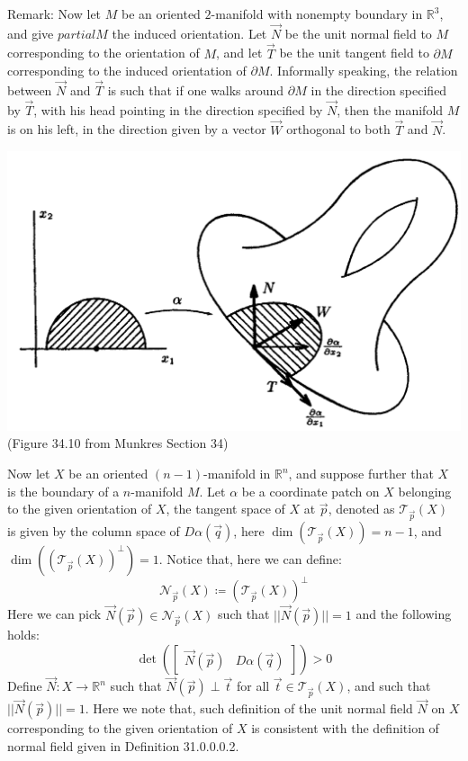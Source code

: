 \documentclass[11pt,oneside]{book}
\theoremstyle{break}
\theoremstyle{break}
\newcommand{\R}{\mathbb{R}}
\newcommand{\T}{\mathcal{T}}
\newcommand{\bmat}[1]{\begin{bmatrix} #1 \end{bmatrix}}
\newcommand{\remark}{\color{blue}Remark: \color{black}}
\begin{document}
\remark Now let $M$ be an oriented $2$-manifold with nonempty boundary in $\R^3$, and give $partial M$ the induced orientation. Let $\vec{N}$ be the unit normal field to $M$ corresponding to the orientation of $M$, and let $\vec{T}$ be the unit tangent field to $\partial M$ corresponding to the induced orientation of $\partial M$. Informally speaking, the relation between $\vec{N}$ and $\vec{T}$ is such that if one walks around $\partial M$ in the direction specified by $\vec{T}$, with his head pointing in the direction specified by $\vec{N}$, then the manifold $M$ is on his left, in the direction given by a vector $\vec{W}$ orthogonal to both $\vec{T}$ and $\vec{N}$. \\
\begin{center}
\includegraphics[scale=0.29]{2Orientation.png}\\
(Figure 34.10 from Munkres Section 34)
\end{center}

\hfill\break\hfill\break
Now let $X$ be an oriented $(n-1)$-manifold in $\R^n$, and suppose further that $X$ is the boundary of a $n$-manifold $M$. Let $\alpha$ be a coordinate patch on $X$ belonging to the given orientation of $X$, the tangent space of $X$ at $\vec{p}$, denoted as $\T_{\vec{p}}(X)$ is given by the column space of $D\alpha(\vec{q})$, here $\dim(\T_{\vec{p}}(X)) = n-1$, and $\dim((\T_{\vec{p}}(X))^{\perp}) = 1$. Notice that, here we can define: 
$$\mathcal{N}_{\vec{p}}(X) \coloneqq (\T_{\vec{p}}(X))^\perp$$ 
Here we can pick $\vec{N}(\vec{p}) \in \mathcal{N}_{\vec{p}}(X)$ such that $||\vec{N}(\vec{p})|| = 1$ and the following holds: 
$$\det\left(\bmat{\vec{N}(\vec{p}) & D\alpha(\vec{q})}\right) >0$$ 
Define $\vec{N}:X \to \R^n$ such that $\vec{N}(\vec{p}) \perp \vec{t}$ for all $\vec{t}\in \T_{\vec{p}}(X)$, and such that $||\vec{N}(\vec{p})|| = 1$. Here we note that, such definition of the unit normal field $\vec{N}$ on $X$ corresponding to the given orientation of $X$ is consistent with the definition of normal field given in Definition 31.0.0.0.2. \\
\end{document}
